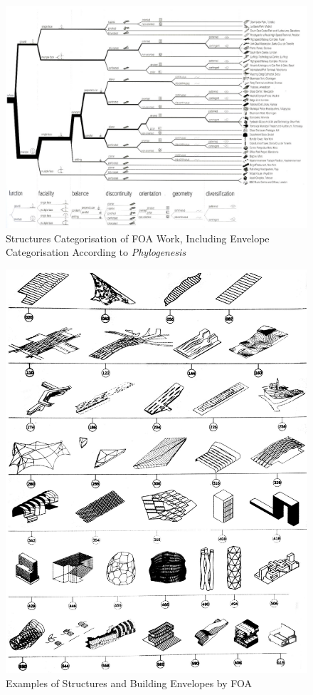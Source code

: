 \begin{figure}
	\centering
	\includegraphics[width=20cm]{./Images/1-Phylogenesis}
	\caption[FOA Phylogenesis]{Structures Categorisation of FOA Work, Including Envelope Categorisation According to \emph{Phylogenesis} \cite{foa04}}
	\label{fig:Phylogenesis}
\end{figure}

\begin{figure}[H]
	\centering
	\includegraphics[width=\textwidth]{./Images/2-Envelopes}
	\caption[FOA Building Envelopes]{Examples of Structures and Building Envelopes by FOA \cite{foa04}}
	\label{fig:FOAEnvelopes}
\end{figure}

